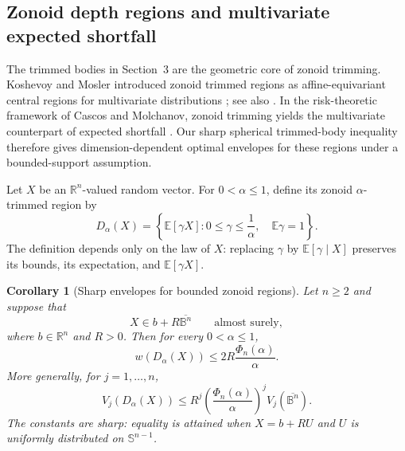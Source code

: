\documentclass[11pt,reqno]{amsart}
\newtheorem{corollary}[theorem]{Corollary}
\theoremstyle{remark}
\begin{document}
\subsection{Zonoid depth regions and multivariate expected shortfall}

The trimmed bodies in Section~3 are the geometric core of zonoid trimming.
Koshevoy and Mosler introduced zonoid trimmed regions as affine-equivariant
central regions for multivariate distributions \cite{KoshevoyMosler1997};
see also \cite{Mosler}.  In the risk-theoretic framework of Cascos and
Molchanov, zonoid trimming yields the multivariate counterpart of expected
shortfall \cite{CascosMolchanov}.  Our sharp spherical trimmed-body
inequality therefore gives dimension-dependent optimal envelopes for these
regions under a bounded-support assumption.

Let $X$ be an $\mathbb R^n$-valued random vector.  For
$0<\alpha\le1$, define its zonoid $\alpha$-trimmed region by
\begin{equation}\label{eq:zonoid-region}
 D_\alpha(X)
 =
 \left\{
 \mathbb E[\gamma X]:
 0\le\gamma\le\frac1\alpha,\quad
 \mathbb E\gamma=1
 \right\}.
\end{equation}
The definition depends only on the law of $X$: replacing $\gamma$ by
$\mathbb E[\gamma\mid X]$ preserves its bounds, its expectation, and
$\mathbb E[\gamma X]$.

\begin{corollary}[Sharp envelopes for bounded zonoid regions]
\label{cor:zonoid-envelope}
Let $n\ge2$ and suppose that
\[
 X\in b+R\overline{\mathbb B^n}
 \qquad\text{almost surely},
\]
where $b\in\mathbb R^n$ and $R>0$.  Then for every
$0<\alpha\le1$,
\begin{equation}\label{eq:zonoid-width}
 w(D_\alpha(X))
 \le
 2R\frac{\Phi_n(\alpha)}{\alpha}.
\end{equation}
More generally, for $j=1,\ldots,n$,
\begin{equation}\label{eq:zonoid-intrinsic}
 V_j(D_\alpha(X))
 \le
 R^j
 \left(\frac{\Phi_n(\alpha)}{\alpha}\right)^j
 V_j(\overline{\mathbb B^n}).
\end{equation}
The constants are sharp: equality is attained when
$X=b+RU$ and $U$ is uniformly distributed on $\mathbb S^{n-1}$.
\end{corollary}
\end{document}

